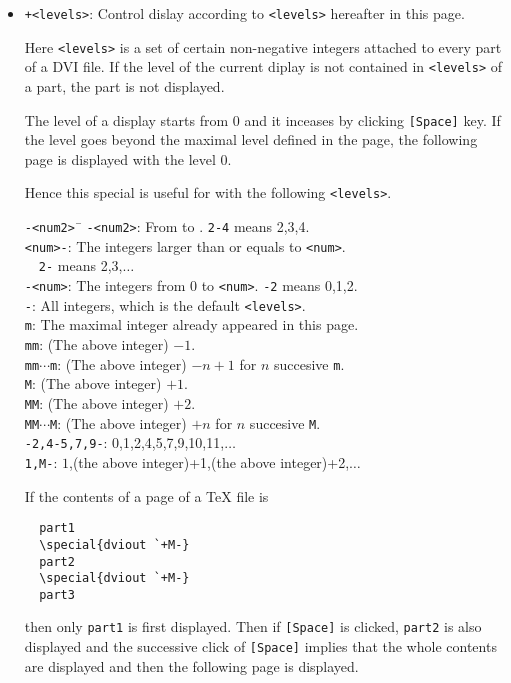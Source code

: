 \documentclass{article}
\begin{document}
\begin{itemize}
\item {\tt+<levels>}: %
Control dislay according to {\tt <levels>} hereafter in this page.

Here \verb|<levels>| is a set of certain non-negative integers attached to
every part of a DVI file.
If the level of the current diplay is not contained in {\tt<levels>} of a 
part, the part is not displayed.

The level of a display starts from 0 and it inceases by clicking 
{\tt [Space]} key.
If the level goes beyond the maximal level defined in the page, 
the following page is displayed with  the level 0. 

Hence this special is useful for 
with the following {\tt<levels>}.
\begin{tabbing}
 {\tt <num1>-<num2>}\ \= \kill
 {\tt <num1>-<num2>}\>: From {\tt<num1>} to {\tt<num2>}.  {\tt2-4} means 2,3,4.\\
 {\tt <num>-}\>: The integers larger than or equals to {\tt<num>}.\\
  \>\ \ {\tt 2-} means 2,3,$\ldots$\\
 {\tt -<num>}\>: The integers from 0 to {\tt<num>}. {\tt -2} means 0,1,2.\\
 {\tt -}\>: All integers, which is the default {\tt<levels>}.\\
 {\tt m}\>: The maximal integer already appeared in this page.\\
 {\tt mm}\>: (The above integer) $-1$.\\
 {\tt mm$\cdots$m}\>: (The above integer) $-n+1$ for $n$ succesive {\tt m}.\\
 {\tt M}\>: (The above integer) $+1$.\\
 {\tt MM}\>: (The above integer) $+2$.\\
 {\tt MM$\cdots$M}\>: (The above integer) $+n$ for $n$ succesive {\tt M}.\\
 {\tt -2,4-5,7,9-}\>: 0,1,2,4,5,7,9,10,11,$\ldots$\\
 {\tt 1,M-}\>: $1$,(the above integer)+1,(the above integer)+2,$\ldots$
\end{tabbing}
If the contents of a page of a {\TeX} file is
\begin{verbatim}
  part1
  \special{dviout `+M-}
  part2
  \special{dviout `+M-}
  part3
\end{verbatim}
then only {\tt part1} is first displayed. Then if {\tt[Space]} is clicked,
{\tt part2} is also displayed and the successive click of {\tt[Space]} implies 
that the whole contents are displayed and then the following page is displayed.


\end{itemize}
\end{document}
